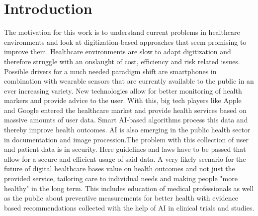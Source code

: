\section{Introduction}
The motivation for this work is to understand current problems in healthcare environments and look at digitization-based approaches that seem promising to improve them. Healthcare environments are slow to adapt digitization and therefore struggle with an onslaught of cost, efficiency and risk related issues. Possible drivers for a much needed paradigm shift are smartphones in combination with wearable sensors that are currently available to the public in an ever increasing variety. New technologies allow for better monitoring of health markers and provide advice to the user. With this, big tech players like Apple and Google entered the healthcare market and provide health services based on massive amounts of user data. Smart AI-based algorithms process this data and thereby improve health outcomes. AI is also emerging in the public health sector in documentation and image procession.The problem with this collection of user and patient data is in security. Here guidelines and laws have to be passed that allow for a secure and efficient usage of said data. A very likely scenario for the future of digital healthcare bases value on health outcomes and not just the provided service, tailoring care to individual needs and making people "more healthy" in the long term. This includes education of medical professionals as well as the public about preventive measurements for better health with evidence based recommendations collected with the help of AI in clinical trials and studies.

